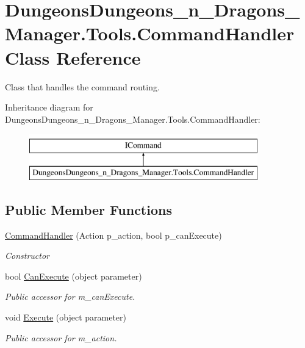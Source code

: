 \hypertarget{class_dungeons_dungeons__n___dragons___manager_1_1_tools_1_1_command_handler}{}\section{Dungeons\+Dungeons\+\_\+n\+\_\+\+Dragons\+\_\+\+Manager.\+Tools.\+Command\+Handler Class Reference}
\label{class_dungeons_dungeons__n___dragons___manager_1_1_tools_1_1_command_handler}


Class that handles the command routing.  


Inheritance diagram for Dungeons\+Dungeons\+\_\+n\+\_\+\+Dragons\+\_\+\+Manager.\+Tools.\+Command\+Handler\+:\begin{figure}[H]
\begin{center}
\leavevmode
\includegraphics[height=2.000000cm]{class_dungeons_dungeons__n___dragons___manager_1_1_tools_1_1_command_handler}
\end{center}
\end{figure}
\subsection*{Public Member Functions}
\begin{DoxyCompactItemize}
\item 
\mbox{\hyperlink{class_dungeons_dungeons__n___dragons___manager_1_1_tools_1_1_command_handler_a2b2ec0ea1f5502d143bd542abf6814f1}{Command\+Handler}} (Action p\+\_\+action, bool p\+\_\+can\+Execute)
\begin{DoxyCompactList}\small\item\em Constructor \end{DoxyCompactList}\item 
bool \mbox{\hyperlink{class_dungeons_dungeons__n___dragons___manager_1_1_tools_1_1_command_handler_ad01d2fb7cb3385ab75245551f4f52aa2}{Can\+Execute}} (object parameter)
\begin{DoxyCompactList}\small\item\em Public accessor for m\+\_\+can\+Execute. \end{DoxyCompactList}\item 
void \mbox{\hyperlink{class_dungeons_dungeons__n___dragons___manager_1_1_tools_1_1_command_handler_a193be54c456f734a4b5554ab95dffb17}{Execute}} (object parameter)
\begin{DoxyCompactList}\small\item\em Public accessor for m\+\_\+action. \end{DoxyCompactList}\end{DoxyCompactItemize}
